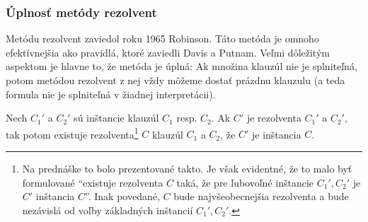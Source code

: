 \subsubsection{Úplnosť metódy rezolvent}
Metódu rezolvent zaviedol roku 1965 Robinson.
Táto metóda je omnoho efektívnejšia ako pravidlá, ktoré zaviedli
Davis a Putnam. Veľmi dôležitým aspektom je hlavne to, že metóda
je úplná:
Ak množina klauzúl nie je splniteľná, potom metódou rezolvent z nej vždy
môžeme dostať prázdnu klauzulu 
(a teda formula nie je splniteľná v žiadnej interpretácii). 

\begin{lema}
    Nech $C_1'$ a $C_2'$ sú inštancie klauzúl $C_1$ resp. $C_2$.
    Ak $C'$ je rezolventa $C_1'$ a $C_2'$,
    tak potom existuje rezolventa\footnote{Na prednáške to bolo
        prezentované takto. Je však evidentné, že to malo byť
        formulované ``existuje rezolventa $C$ taká, že pre ľubovoľné
        inštancie $C_1',C_2'$ je $C'$ inštancia $C$''. Inak povedané,
        $C$ bude najvšeobecnejšia rezolventa a bude nezávislá od voľby
        základných inštancií $C_1',C_2'$.}
    $C$ klauzúl $C_1$ a $C_2$, 
    že $C'$ je inštancia $C$. 
\end{lema}

